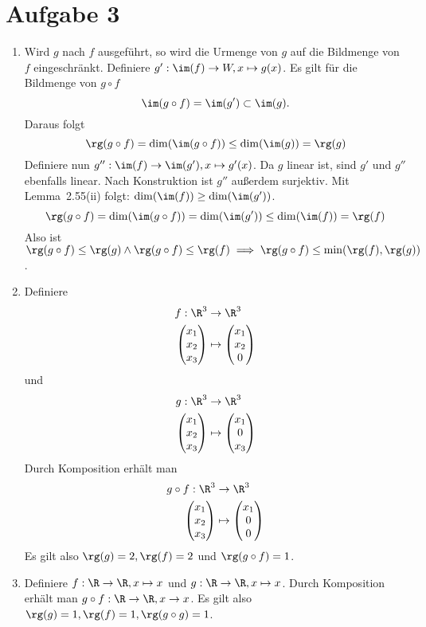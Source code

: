 \documentclass{article}
\begin{document}
	\section*{Aufgabe 3}
	\begin{enumerate}
		\item Wird $g$ nach $f$ ausgeführt, so wird die Urmenge von $g$ auf die Bildmenge von $f$ eingeschränkt. Definiere $g': \im(f) \to W, x\mapsto g(x)$. Es gilt für die Bildmenge von $g\circ f$ $$\im(g\circ f) = \im(g') \subset \im(g).$$ Daraus folgt
		\[\rg(g \circ f) = \dim(\im(g\circ f)) \leq \dim(\im(g)) = \rg(g)\]
		Definiere nun $g'': \im(f) \to \im(g'), x\mapsto g'(x)$. Da $g$ linear ist, sind $g'$ und $g''$ ebenfalls linear. Nach Konstruktion ist $g''$ außerdem surjektiv. Mit Lemma~2.55(ii) folgt: $\dim(\im(f)) \geq \dim(\im(g'))$.
		\[\rg(g \circ f) = \dim(\im(g\circ f)) = \dim(\im(g'))\leq \dim(\im(f)) = \rg(f)\]
		Also ist $\rg(g \circ f) \leq \rg(g) \land \rg(g \circ f) \leq \rg(f) \implies \rg(g \circ f) \leq \min(\rg(f), \rg(g))$.
		\item Definiere \begin{align*}
			f: \R^3 &\to \R^3\\
			\begin{pmatrix}x_1\\x_2\\x_3\end{pmatrix} &\mapsto \begin{pmatrix}x_1\\x_2\\0\end{pmatrix}
		\end{align*}
		und
		\begin{align*}
		g: \R^3 &\to \R^3\\
		\begin{pmatrix}x_1\\x_2\\x_3\end{pmatrix} &\mapsto \begin{pmatrix}x_1\\0\\x_3\end{pmatrix}
		\end{align*}
		Durch Komposition erhält man
		\begin{align*}
			g\circ f: \R^3 &\to \R^3\\
			\begin{pmatrix}x_1\\x_2\\x_3\end{pmatrix} &\mapsto \begin{pmatrix}x_1\\0\\0\end{pmatrix}
		\end{align*}
		Es gilt also $\rg(g) = 2, \rg(f) = 2$ und $\rg(g\circ f) = 1$.
		\item Definiere $f: \R \to \R, x\mapsto x$ und $g: \R \to \R, x\mapsto x$. Durch Komposition erhält man $g\circ f: \R \to \R, x\to x$. Es gilt also $\rg(g) = 1, \rg(f) = 1, \rg(g\circ g) = 1$.
	\end{enumerate}
\end{document}
